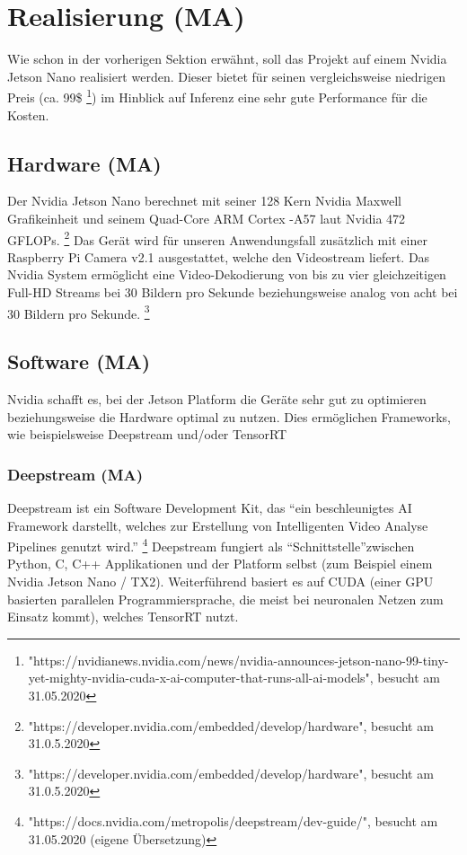 \documentclass[a4paper,oneside,12pt]{report}
\begin{document}
	\chapter{Realisierung (MA)}
	\begin{onehalfspace}
		Wie schon in der vorherigen Sektion erwähnt, soll das Projekt auf einem Nvidia Jetson Nano realisiert werden. Dieser bietet für seinen vergleichsweise niedrigen Preis (ca. 99\$
		\footnote{"https://nvidianews.nvidia.com/news/nvidia-announces-jetson-nano-99-tiny-yet-mighty-nvidia-cuda-x-ai-computer-that-runs-all-ai-models", besucht am 31.05.2020})
		im Hinblick auf Inferenz eine sehr gute Performance für die Kosten.
		\section{Hardware (MA)}
		Der Nvidia Jetson Nano berechnet mit seiner 128 Kern Nvidia Maxwell Grafikeinheit und seinem Quad-Core ARM Cortex -A57 laut Nvidia 472 GFLOPs.
		\footnote{"https://developer.nvidia.com/embedded/develop/hardware", besucht am 31.0.5.2020}
		Das Gerät wird für unseren Anwendungsfall zusätzlich mit einer Raspberry Pi Camera v2.1 ausgestattet, welche den Videostream liefert. Das Nvidia System ermöglicht eine Video-Dekodierung von bis zu vier gleichzeitigen Full-HD Streams bei 30 Bildern pro Sekunde beziehungsweise analog von acht bei 30 Bildern pro Sekunde.
		\footnote{"https://developer.nvidia.com/embedded/develop/hardware", besucht am 31.0.5.2020}
		\section{Software (MA)}
		Nvidia schafft es, bei der Jetson Platform die Geräte sehr gut zu optimieren beziehungsweise die Hardware optimal zu nutzen. Dies ermöglichen Frameworks, wie beispielsweise Deepstream und/oder TensorRT
		\subsection{Deepstream (MA)}
		Deepstream ist ein Software Development Kit, das "`ein beschleunigtes AI Framework darstellt, welches zur Erstellung von Intelligenten Video Analyse Pipelines genutzt wird."'
		\footnote{"https://docs.nvidia.com/metropolis/deepstream/dev-guide/", besucht am 31.05.2020 (eigene Übersetzung)}
		Deepstream fungiert als "`Schnittstelle"'\space zwischen Python, C, C++ Applikationen und der Platform selbst (zum Beispiel einem Nvidia Jetson Nano / TX2).
		Weiterführend basiert es auf CUDA (einer GPU basierten parallelen Programmiersprache, die meist bei neuronalen Netzen zum Einsatz kommt), welches TensorRT nutzt.

\end{onehalfspace}
\end{document}

